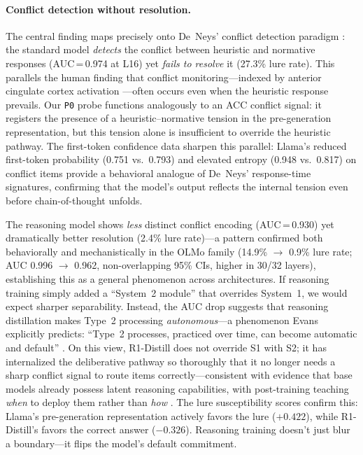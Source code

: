 \documentclass[accepted]{article}
\newcommand{\pzero}{\texttt{P0}}
\begin{document}
\paragraph{Conflict detection without resolution.}
The central finding maps precisely onto De~Neys' conflict detection
paradigm \citep{deneys2012bias, deneys2017dual}: the standard model
\emph{detects} the conflict between heuristic and normative responses
(AUC\,=\,0.974 at L16) yet \emph{fails to resolve} it (27.3\% lure
rate).  This parallels the human finding that conflict monitoring---indexed
by anterior cingulate cortex activation \citep{botvinick2001conflict,
kerns2004anterior}---often occurs even when the heuristic response
prevails.  Our \pzero{} probe functions analogously to an ACC conflict
signal: it registers the presence of a heuristic--normative tension in
the pre-generation representation, but this tension alone is insufficient
to override the heuristic pathway.  The first-token confidence data
sharpen this parallel: Llama's reduced first-token probability (0.751
vs.\ 0.793) and elevated entropy (0.948 vs.\ 0.817) on conflict items
provide a behavioral analogue of De~Neys' response-time signatures,
confirming that the model's output reflects the internal tension even
before chain-of-thought unfolds.

The reasoning model shows \emph{less} distinct conflict encoding
(AUC\,=\,0.930) yet dramatically better resolution (2.4\% lure rate)---a
pattern confirmed both behaviorally and mechanistically in the OLMo
family (14.9\% $\to$ 0.9\% lure rate; AUC 0.996 $\to$ 0.962,
non-overlapping 95\% CIs, higher in 30/32 layers), establishing this
as a general phenomenon across architectures.
If reasoning training simply added a ``System~2 module'' that overrides
System~1, we would expect sharper separability.  Instead, the AUC drop
suggests that reasoning distillation makes Type~2 processing
\emph{autonomous}---a phenomenon Evans explicitly predicts:
``Type~2 processes, practiced over time, can become automatic and
default'' \citep{evans2019reflections, evans2013dual}.  On this view,
R1-Distill does not override S1 with S2; it has internalized the
deliberative pathway so thoroughly that it no longer needs a sharp
conflict signal to route items correctly---consistent with evidence
that base models already possess latent reasoning capabilities, with
post-training teaching \emph{when} to deploy them rather than
\emph{how} \citep{venhoff2025base}.  The lure susceptibility scores
confirm this: Llama's pre-generation representation actively favors the
lure ($+0.422$), while R1-Distill's favors the correct answer
($-0.326$).  Reasoning training doesn't just blur a boundary---it
flips the model's default commitment.
\end{document}
